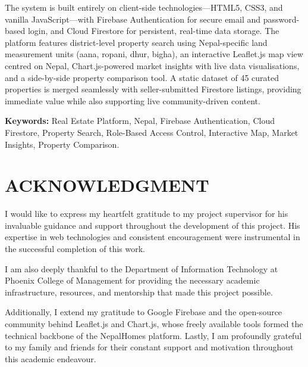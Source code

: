 \documentclass[12pt,a4paper]{report}
\begin{document}
The system is built entirely on client-side technologies---HTML5, CSS3, and
vanilla JavaScript---with Firebase Authentication for secure email and
password-based login, and Cloud Firestore for persistent, real-time data storage.
The platform features district-level property search using Nepal-specific land
measurement units (aana, ropani, dhur, bigha), an interactive Leaflet.js map
view centred on Nepal, Chart.js-powered market insights with live data
visualisations, and a side-by-side property comparison tool. A static dataset of
45 curated properties is merged seamlessly with seller-submitted Firestore
listings, providing immediate value while also supporting live community-driven
content.

\vspace{0.5cm}
\noindent\textbf{Keywords:} Real Estate Platform, Nepal, Firebase Authentication,
Cloud Firestore, Property Search, Role-Based Access Control, Interactive Map,
Market Insights, Property Comparison.

\clearpage

\chapter*{ACKNOWLEDGMENT}
\thispagestyle{plain}

I would like to express my heartfelt gratitude to my project supervisor for his
invaluable guidance and support throughout the development of this project. His
expertise in web technologies and consistent encouragement were instrumental in
the successful completion of this work.

I am also deeply thankful to the Department of Information Technology at Phoenix
College of Management for providing the necessary academic infrastructure,
resources, and mentorship that made this project possible.

Additionally, I extend my gratitude to Google Firebase and the open-source
community behind Leaflet.js and Chart.js, whose freely available tools formed the
technical backbone of the NepalHomes platform. Lastly, I am profoundly grateful
to my family and friends for their constant support and motivation throughout
this academic endeavour.

\clearpage

\end{document}
